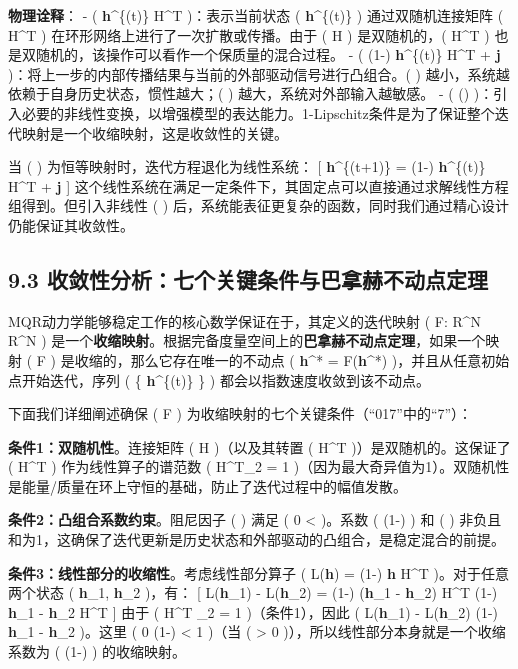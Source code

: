\documentclass[
  12pt,
]{article}
\begin{document}
\textbf{物理诠释}： - ( \textbf{h}\^{}\{(t)\} H\^{}T )：表示当前状态 (
\textbf{h}\^{}\{(t)\} ) 通过双随机连接矩阵 ( H\^{}T )
在环形网络上进行了一次扩散或传播。由于 ( H ) 是双随机的，( H\^{}T )
也是双随机的，该操作可以看作一个保质量的混合过程。 - ( (1-\alpha)
\textbf{h}\^{}\{(t)\} H\^{}T + \alpha \textbf{j}
)：将上一步的内部传播结果与当前的外部驱动信号进行凸组合。( \alpha )
越小，系统越依赖于自身历史状态，惯性越大；( \alpha )
越大，系统对外部输入越敏感。 - ( \sigma(\cdot)
)：引入必要的非线性变换，以增强模型的表达能力。1-Lipschitz条件是为了保证整个迭代映射是一个收缩映射，这是收敛性的关键。

当 ( \sigma ) 为恒等映射时，迭代方程退化为线性系统： {[}
\textbf{h}\^{}\{(t+1)\} = (1-\alpha) \textbf{h}\^{}\{(t)\} H\^{}T +
\alpha \textbf{j} {]}
这个线性系统在满足一定条件下，其固定点可以直接通过求解线性方程组得到。但引入非线性
( \sigma )
后，系统能表征更复杂的函数，同时我们通过精心设计仍能保证其收敛性。

\hypertarget{ux6536ux655bux6027ux5206ux6790ux4e03ux4e2aux5173ux952eux6761ux4ef6ux4e0eux5df4ux62ffux8d6bux4e0dux52a8ux70b9ux5b9aux7406}{%
\subsection{9.3
收敛性分析：七个关键条件与巴拿赫不动点定理}\label{ux6536ux655bux6027ux5206ux6790ux4e03ux4e2aux5173ux952eux6761ux4ef6ux4e0eux5df4ux62ffux8d6bux4e0dux52a8ux70b9ux5b9aux7406}}

MQR动力学能够稳定工作的核心数学保证在于，其定义的迭代映射 ( F:
R\^{}N \to R\^{}N )
是一个\textbf{收缩映射}。根据完备度量空间上的\textbf{巴拿赫不动点定理}，如果一个映射
( F ) 是收缩的，那么它存在唯一的不动点 ( \textbf{h}\^{}* =
F(\textbf{h}\^{}*) )，并且从任意初始点开始迭代，序列 ( \{
\textbf{h}\^{}\{(t)\} \} ) 都会以指数速度收敛到该不动点。

下面我们详细阐述确保 ( F )
为收缩映射的七个关键条件（``017''中的``7''）：

\textbf{条件1：双随机性}。连接矩阵 ( H )（以及其转置 ( H\^{}T
)）是双随机的。这保证了 ( H\^{}T ) 作为线性算子的谱范数 (
\textbar H\^{}T\textbar\_2 = 1
)（因为最大奇异值为1）。双随机性是能量/质量在环上守恒的基础，防止了迭代过程中的幅值发散。

\textbf{条件2：凸组合系数约束}。阻尼因子 ( \alpha ) 满足 ( 0 \textless{}
\alpha {} )。系数 ( (1-\alpha) ) 和 ( \alpha )
非负且和为1，这确保了迭代更新是历史状态和外部驱动的凸组合，是稳定混合的前提。

\textbf{条件3：线性部分的收缩性}。考虑线性部分算子 (
L(\textbf{h}) = (1-\alpha) \textbf{h} H\^{}T
)。对于任意两个状态 ( \textbf{h}\_1, \textbf{h}\_2 )，有： {[}
\textbar{} L(\textbf{h}\_1) - L(\textbf{h}\_2)
\textbar{} = \textbar{} (1-\alpha) (\textbf{h}\_1 - \textbf{h}\_2)
H\^{}T \textbar{} \le (1-\alpha) \textbar{} \textbf{h}\_1 -
\textbf{h}\_2 \textbar{} \cdot \textbar{} H\^{}T \textbar{} {]} 由于 (
\textbar{} H\^{}T \textbar\_2 = 1 )（条件1），因此 ( \textbar{}
L(\textbf{h}\_1) - L(\textbf{h}\_2) \textbar{}
\le (1-\alpha) \textbar{} \textbf{h}\_1 - \textbf{h}\_2 \textbar{}
)。这里 ( 0 \le (1-\alpha) \textless{} 1 )（当 ( \alpha \textgreater{} 0
)），所以线性部分本身就是一个收缩系数为 ( (1-\alpha) ) 的收缩映射。
\end{document}
